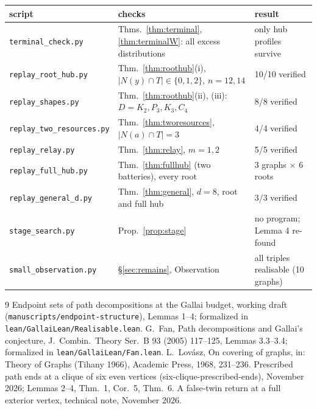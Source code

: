 \documentclass[11pt]{amsart}
\theoremstyle{definition}
\begin{document}
\begin{center}\footnotesize
\begin{tabular}{lll}
\toprule
script & checks & result\\
\midrule
\texttt{terminal\_check.py} & Thms.~\ref{thm:terminal}, \ref{thm:terminalW}: all excess distributions & only hub profiles survive\\
\texttt{replay\_root\_hub.py} & Thm.~\ref{thm:roothub}(i), $|N(y)\cap T|\in\{0,1,2\}$, $n=12,14$ & 10/10 verified\\
\texttt{replay\_shapes.py} & Thm.~\ref{thm:roothub}(ii), (iii): $D=K_2,P_3,K_3,C_4$ & 8/8 verified\\
\texttt{replay\_two\_resources.py} & Thm.~\ref{thm:tworesources}, $|N(a)\cap T|=3$ & 4/4 verified\\
\texttt{replay\_relay.py} & Thm.~\ref{thm:relay}, $m=1,2$ & 5/5 verified\\
\texttt{replay\_full\_hub.py} & Thm.~\ref{thm:fullhub} (two batteries), every root & 3 graphs $\times$ 6 roots\\
\texttt{replay\_general\_d.py} & Thm.~\ref{thm:general}, $d=8$, root and full hub & 3/3 verified\\
\texttt{stage\_search.py} & Prop.~\ref{prop:stage} & no program; Lemma 4 re-found\\
\texttt{small\_observation.py} & \S\ref{sec:remains}, Observation & all triples realisable (10 graphs)\\
\bottomrule
\end{tabular}
\end{center}

\begin{thebibliography}{9}
 Endpoint sets of path decompositions at the Gallai budget, working draft
(\texttt{manuscripts/endpoint-structure}), Lemmas 1--4; formalized in
\texttt{lean/GallaiLean/Realisable.lean}.
 G.~Fan, Path decompositions and Gallai's conjecture, J.\ Combin.\ Theory Ser.~B 93
(2005) 117--125, Lemmas 3.3--3.4; formalized in \texttt{lean/GallaiLean/Fan.lean}.
 L.~Lov\'asz, On covering of graphs, in: Theory of Graphs (Tihany 1966), Academic
Press, 1968, 231--236.
 Prescribed path ends at a clique of six even vertices (six-clique-prescribed-ends),
November 2026; Lemmas 2--4, Thm.~1, Cor.~5, Thm.~6.
 A false-twin return at a full exterior vertex, technical note, November 2026.
\end{thebibliography}
\end{document}
